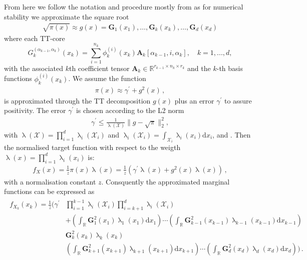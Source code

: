 From here we follow the notation and procedure mostly from \cite{cui2022deep} as for numerical stability we approximate the square root
\begin{align}
	\sqrt{\pi(x)} \approx g(x) = \bm{G}_1(x_1), \dots ,  \bm{G}_k(x_k), \dots ,  \bm{G}_d(x_d)
\end{align}
where each TT-core
\begin{equation}
	G^{(\alpha_{k-1},\alpha_k)}_k(x_k) = \sum_{i=1}^{n_k} \phi^{(i)}_k(x_k) \bm{A}_k[\alpha_{k-1}, i, \alpha_k], \quad k = 1, ..., d,
\end{equation}
with the associated $k$th coefficient tensor $\bm{A}_k \in \mathbb{R}^{r_{k-1} \times n_k \times r_k}$ and the $k$-th  basis functions $\phi^{(i)}_k(x_k)$.
We assume the function
\begin{align}
	\pi(x) \approx \gamma^{\prime} + g^2(x) \, ,
\end{align} 
is approximated through the TT decomposition $g(x)$ plus an error $\gamma^{\prime}$ to assure positivity.
The error $\gamma^{\prime}$  is chosen according to the L2 norm 
\begin{align}
	\gamma^{\prime} \leq \frac{1}{\uplambda( \mathcal{X})} \lVert g - \sqrt{\pi}\rVert^2_2 ,
\end{align}
with $\uplambda( \mathcal{X}) = \prod_{i = 1}^{d}  \uplambda_i( \mathcal{X}_i) $ and  $\uplambda_i( \mathcal{X}_i) = \int_{ \mathcal{X}_i} \uplambda_i (x_i) \text{d}x_i$, and .
Then the normalised target function with respect to the weigth $\uplambda(x) = \prod_{i=1}^{d} \uplambda_i(x_i) $ is: 
\begin{align}
	f_X(x) = \frac{1}{z} \pi(x) \uplambda(x) = \frac{1}{z} ( \gamma^{\prime} \uplambda(x) + g^2(x) \uplambda(x)) \, ,
\end{align} 
with a normalisation constant $z$.
Consquently the approximated marginal functions can be expressed as
\begin{align}
	\begin{split}
		f_{X_k}(x_k) = \frac{1}{z}  \Bigg( \gamma^{\prime}& \prod_{i=1}^{k-1} \uplambda_i(\mathcal{X}_i) \prod_{i=k+1}^{d} \uplambda_i(\mathcal{X}_i) \\&+  \left( \int_{\mathbb{R}} \bm{G}^2_{1}(x_1) \uplambda_1(x_1)\text{d}x_{1} \right) \cdots \left( \int_{\mathbb{R}} \bm{G}^2_{k-1}(x_{k-1}) \uplambda_{k-1}(x_{k-1}) \text{d}x_{k-1} \right) \\ & \bm{G}^2_{k}(x_k)\uplambda_k(x_{k})\\ & \left( \int_{\mathbb{R}}  \bm{G}^2_{k+1}(x_{k+1})\uplambda_{k+1}(x_{k+1})\text{d}x_{k+1} \right) \cdots  \left( \int_{\mathbb{R}} \bm{G}^2_{d}(x_d)\uplambda_d(x_{d})\text{d}x_d \right) \Bigg) \, .
	\end{split} 
\end{align}

